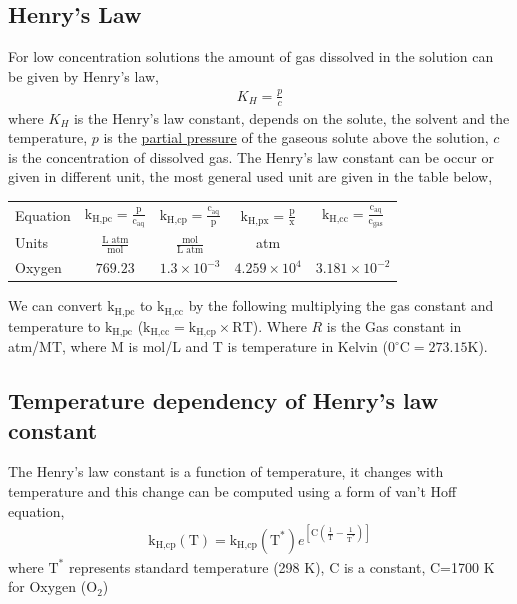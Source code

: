 \documentclass[12pt]{book}
\begin{document}
\subsection{Henry's Law}
\label{Henry's law section}
For low concentration solutions the amount of gas dissolved in the solution can be given by Henry's law,
\begin{align}
K_H=\frac{p}{c}
\label{Henry's Law}
\end{align}
where $K_H$ is the Henry's law constant, depends on the solute, the solvent and the temperature, $p$ is the \underline{partial pressure} of the gaseous solute above the solution, $c$ is the concentration of dissolved gas.
The Henry's law constant can be occur or given in different unit, the most general used unit are given in the table below,
\begin{center}
	\begin{tabular}{ |l|c|c|c|c|}
		\hline
		Equation & $\textrm{k}_{\textrm{H,pc}}=\frac{\textrm{p}}{\textrm{c}_{\textrm{aq}}}$ & $\textrm{k}_{\textrm{H,cp}}=\frac{\textrm{c}_{\textrm{aq}}}{\textrm{p}}$ & $\textrm{k}_{\textrm{H,px}}=\frac{\textrm{p}}{\textrm{x}}$ & $\textrm{k}_{\textrm{H,cc}}=\frac{\textrm{c}_{\textrm{aq}}}{\textrm{c}_{\textrm{gas}}}$\\\cline{1-1}
		Units & $\frac{\textrm{L atm}}{\textrm{mol}}$ & $\frac{\textrm{mol}}{\textrm{L atm}}$ & atm & \\
		\hline
		Oxygen & $769.23$ & $1.3\times 10^{-3}$ & $4.259\times 10^4$ & $3.181\times 10^{-2}$\\
		\hline
	\end{tabular}
\end{center}
We can convert $\textrm{k}_{\textrm{H,pc}}$ to $\textrm{k}_{\textrm{H,cc}}$ by the following multiplying the gas constant and temperature to $\textrm{k}_{\textrm{H,pc}}$ ($\textrm{k}_{\textrm{H,cc}}=\textrm{k}_{\textrm{H,cp}}\times \textrm{RT}$). Where $R$ is the Gas constant in atm/MT, where M is mol/L and T is temperature in Kelvin ($0^\circ\textrm{C}=273.15\textrm{K}$).

\subsection{Temperature dependency of Henry's law constant}
The Henry's law constant is a function of temperature, it changes with temperature and this change can be computed using a form of van't Hoff equation,
\begin{align}
\textrm{k}_{\textrm{H,cp}}(\textrm{T})=\textrm{k}_{\textrm{H,cp}}(\textrm{T}^\ast)e^{\left[\textrm{C}\left(\frac{1}{\textrm{T}}-\frac{1}{\textrm{T}^\ast}\right)\right]}
\label{van't Hoff equation}
\end{align}
where $\textrm{T}^\ast$ represents standard temperature (298 K\label{key}), C is a constant, C=1700 K for Oxygen (O$_2$) 
\end{document}
